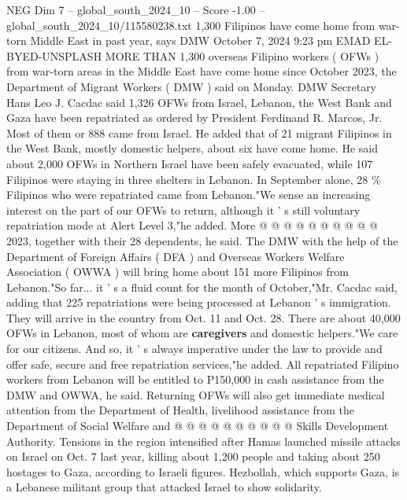 \begin{textsample}{NEG Dim 7 – global\_south\_2024\_10 – Score -1.00 – global\_south\_2024\_10/115580238.txt}  \label{ex:f7_neg_230}
1,300 Filipinos have come home from war-torn Middle East in past year, says DMW October 7, 2024 9:23 pm EMAD EL-BYED-UNSPLASH MORE THAN 1,300 overseas Filipino workers ( OFWs ) from war-torn areas in the Middle East have come home since October 2023, the Department of Migrant Workers ( DMW ) said on Monday.
DMW Secretary Hans Leo J.
Cacdac said 1,326 OFWs from Israel, Lebanon, the West Bank and Gaza have been repatriated as ordered by President Ferdinand R.
Marcos, Jr.
Most of them or 888 came from Israel.
He added that of 21 migrant Filipinos in the West Bank, mostly domestic helpers, about six have come home.
He said about 2,000 OFWs in Northern Israel have been safely evacuated, while 107 Filipinos were staying in three shelters in Lebanon.
In September alone, 28 \% Filipinos who were repatriated came from Lebanon."We sense an increasing interest on the part of our OFWs to return, although it ' s still voluntary repatriation mode at Alert Level 3,"he added.
More @ @ @ @ @ @ @ @ @ @ 2023, together with their 28 dependents, he said.
The DMW with the help of the Department of Foreign Affairs ( DFA ) and Overseas Workers Welfare Association ( OWWA ) will bring home about 151 more Filipinos from Lebanon."So far... it ' s a fluid count for the month of October,"Mr.
Cacdac said, adding that 225 repatriations were being processed at Lebanon ' s immigration.
They will arrive in the country from Oct. 11 and Oct. 28.
There are about 40,000 OFWs in Lebanon, most of whom are \textbf{caregivers} and domestic helpers."We care for our citizens.
And so, it ' s always imperative under the law to provide and offer safe, secure and free repatriation services,"he added.
All repatriated Filipino workers from Lebanon will be entitled to P150,000 in cash assistance from the DMW and OWWA, he said.
Returning OFWs will also get immediate medical attention from the Department of Health, livelihood assistance from the Department of Social Welfare and @ @ @ @ @ @ @ @ @ @ Skills Development Authority.
Tensions in the region intensified after Hamas launched missile attacks on Israel on Oct. 7 last year, killing about 1,200 people and taking about 250 hostages to Gaza, according to Israeli figures.
Hezbollah, which supports Gaza, is a Lebanese militant group that attacked Israel to show solidarity.

\end{textsample}
